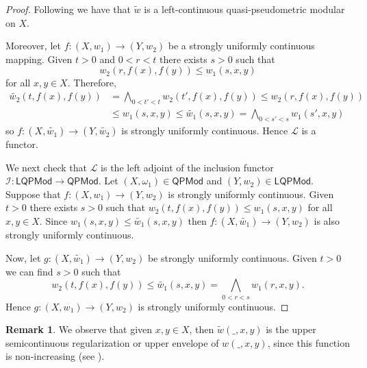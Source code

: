 \documentclass[11pt,a4paper]{amsart}
\theoremstyle{definition}
\newtheorem{remark}[theorem]{Remark}
\begin{document}
	\begin{proof}
		
		Following \cite[Proposition 1.2.5]{Chis15} we have that $\widetilde{w}$ is a left-continuous quasi-pseudometric modular on $X.$
		
		Moreover, let $f:(X,w_1)\to (Y,w_2)$ be a strongly uniformly continuous mapping. Given $t>0$ and $0<r<t$ there exists $s>0$ such that
		$$w_2(r,f(x),f(y))\leq w_1(s,x,y)$$
		for all $x,y\in X.$ Therefore,
		\begin{align*}
			\widetilde{w_2}(t,f(x),f(y))&=\bigwedge_{0<t'<t} w_2(t',f(x),f(y))\leq w_2(r,f(x),f(y))\\&\leq w_1(s,x,y)\leq \widetilde{w_1}(s,x,y)=\bigwedge_{0<s'<s} w_1(s',x,y)
		\end{align*}
		so $f:(X,\widetilde{w_1})\to (Y,\widetilde{w_2})$ is strongly uniformly continuous. Hence $\mathscr{L}$ is a functor.
		
		We next check that $\mathscr{L}$ is the left adjoint of the inclusion functor $\mathscr{I}:\mathsf{LQPMod}\to\mathsf{QPMod}.$ Let $(X,\omega_1)\in\mathsf{QPMod} $ and $(Y,w_2)\in \mathsf{LQPMod}$. Suppose that $f:(X,w_1)\to (Y,w_2)$ is strongly uniformly continuous. Given $t>0$ there exists $s>0$ such that $w_2(t,f(x),f(y))\leq w_1(s,x,y)$ for all $x,y\in X.$ Since $w_1(s,x,y)\leq \widetilde{w_1}(s,x,y)$ then $f:(X,\widetilde{w_1})\to (Y,w_2)$ is also strongly uniformly continuous.
		
		Now, let $g:(X,\widetilde{w_1})\to (Y,w_2)$ be strongly uniformly continuous. Given $t>0$ we can find $s>0$ such that
		$$w_2(t,f(x),f(y))\leq \widetilde{w_1}(s,x,y)=\bigwedge_{0<r<s} w_1(r,x,y).$$
		Hence $g:(X,w_1)\to (Y,w_2)$ is strongly uniformly continuous.
	\end{proof}
	
	\begin{remark}
		We observe that given $x,y\in X$, then $\widetilde{w}(\_,x,y)$ is the upper semicontinuous regularization or upper envelope of $w(\_,x,y)$, since this function is non-increasing (see \cite[Chapter 1.3]{BeerBook}).
	\end{remark}
	
\end{document}

